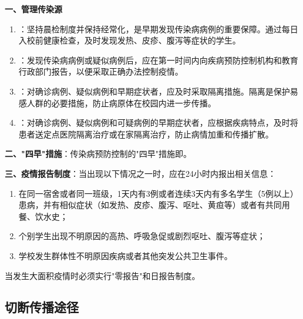 \begin{keybox}
\textbf{一、管理传染源}
\begin{enumerate}[leftmargin=*]
    \item {}：坚持晨检制度并保持经常化，是早期发现传染病病例的重要保障。通过每日入校前健康检查，及时发现发热、皮疹、腹泻等症状的学生。
    \item {}：发现传染病病例或疑似病例后，应在第一时间内向疾病预防控制机构和教育行政部门报告，以便采取正确办法控制疫情。
    \item {}：对确诊病例、疑似病例和早期症状者，应及时采取隔离措施。隔离是保护易感人群的必要措施，防止病原体在校园内进一步传播。
    \item {}：对确诊病例、疑似病例和可疑病例的早期症状者，应根据疾病特点，及时将患者送定点医院隔离治疗或在家隔离治疗，防止病情加重和传播扩散。
\end{enumerate}

\textbf{二、"四早"措施}：传染病预防控制的"四早"措施即。

\textbf{三、疫情报告制度}：当出现以下情况之一时，应在24小时内报出相关信息：
\begin{enumerate}[leftmargin=*]
    \item 在同一宿舍或者同一班级，1天内有3例或者连续3天内有多名学生（5例以上）患病，并有相似症状（如发热、皮疹、腹泻、呕吐、黄疸等）或者有共同用餐、饮水史；
    \item 个别学生出现不明原因的高热、呼吸急促或剧烈呕吐、腹泻等症状；
    \item 学校发生群体性不明原因疾病或者其他突发公共卫生事件。
\end{enumerate}
当发生大面积疫情时必须实行"零报告"和日报告制度。
\end{keybox}

\subsection{切断传播途径}

